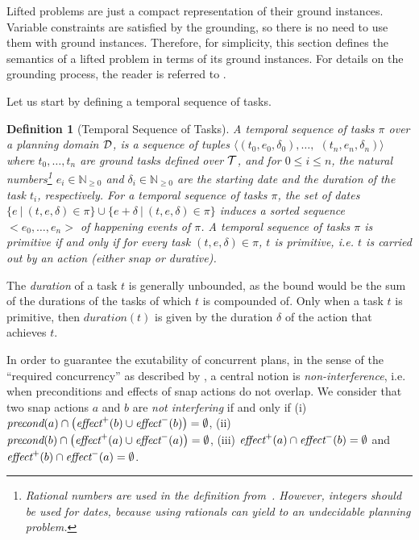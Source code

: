 \documentclass[letterpaper]{article} %
\newtheorem{definition}{Definition}
\newcommand{\pre}{\text{\it precond}}
\newcommand{\add}{\text{\it effect}^{+}}
\newcommand{\del}{\text{\it effect}^{-}}
\begin{document}
  Lifted problems are just a compact representation of their ground instances. Variable constraints are satisfied by the grounding, so there is no need to use them with ground instances. Therefore, for simplicity, this section defines the semantics of a lifted problem in terms of its ground instances. For details on the grounding process, the reader is referred to \cite{behnke20,ramoul17}.

Let us start by defining a temporal sequence of tasks.
\begin{definition}[Temporal Sequence of Tasks] %
  A \emph{temporal sequence of tasks} $\pi$ over a planning domain $\cal{D}$, is a sequence of tuples $\langle (t_0, e_0, \delta_0), \ldots,$ $(t_n, e_n, \delta_n) \rangle$ where $t_0, \ldots, t_n$ are ground tasks defined over $\cal{T}$, and for $0 \le i \le n$,  the natural numbers\footnote{
    Rational numbers are used in the definition from~\citet{fox03}. However, integers should be used for dates, because using rationals can yield to an undecidable planning problem.}
  $e_i \in \mathbb{N}_{\geq 0}$ and $\delta_i \in \mathbb{N}_{\geq 0}$ are the starting date and the duration of the task $t_i$, respectively.
  For a temporal sequence of tasks $\pi$, the set of dates $\{e \ | \ (t, e, \delta) \in \pi\} \cup \{e + \delta \ | \ (t, e, \delta) \in \pi\}$ induces a sorted sequence $<e_0, \ldots, e_n>$ of \emph{happening events} of $\pi$. %
A temporal sequence of tasks  $\pi$ is primitive if and only if for every task  $(t, e, \delta) \in \pi$, $t$ is primitive, i.e. $t$ is carried out by an action (either snap or durative).
\end{definition}

The \emph{duration} of a task $t$ is generally unbounded, as the bound would be the sum of the durations of the tasks of which $t$ is compounded of. Only when a task $t$ is primitive, then $duration(t)$ is given by the duration $\delta$ of the action that achieves $t$.


In order to guarantee the exutability of concurrent plans, in the sense of the ``required concurrency'' as described by \citet{cushing2007temporal}, a central notion is {\it non-interference}, i.e. when preconditions and effects of snap actions do not overlap.
We consider that two snap actions $a$ and $b$ are \emph{not interfering} if and only if (i) $\pre(a) \cap \bigl(\add(b) \cup \del(b)\bigr) = \emptyset$, (ii) $\pre(b) \cap \bigl(\add(a) \cup \del(a)\bigr) = \emptyset$, (iii) $\add(a) \cap \del(b) = \emptyset$ and  $\add(b) \cap \del(a) = \emptyset$.
\end{document}
